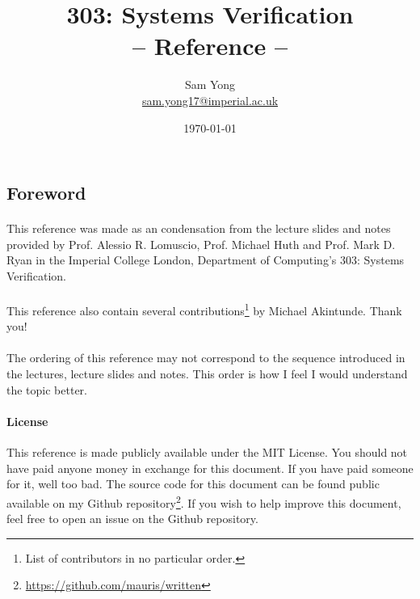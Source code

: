\documentclass{article}
\title{
	 \huge 303: Systems Verification\\
	 \huge -- Reference --
}
\date{\today}
\author{
	Sam Yong \\
	\small \href{mailto:sam.yong17@imperial.ac.uk}{sam.yong17@imperial.ac.uk}
}
\theoremstyle{plain}
\theoremstyle{definition}
\begin{document}
\maketitle

\begin{multicols}{2}

\section*{Foreword}  

\paragraph{} This reference was made as an condensation from the lecture slides and notes provided by Prof. Alessio R. Lomuscio, Prof. Michael Huth and Prof. Mark D. Ryan in the Imperial College London, Department of Computing's 303: Systems Verification.

\paragraph{} This reference also contain several contributions\footnote{List of contributors in no particular order.} by Michael Akintunde. Thank you!

\paragraph{} The ordering of this reference may not correspond to the sequence introduced in the lectures, lecture slides and notes. This order is how I feel I would understand the topic better.

\begin{footnotesize}
\paragraph{License} This reference is made publicly available under the MIT License. You should not have paid anyone money in exchange for this document. If you have paid someone for it, well too bad. The source code for this document can be found public available on my Github repository\footnote{\href{https://github.com/mauris/written}{https://github.com/mauris/written}}. If you wish to help improve this document, feel free to open an issue on the Github repository.
\end{footnotesize}
\newpage

\tableofcontents
\newpage


\end{multicols}
\end{document}
